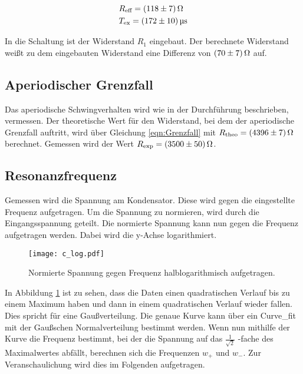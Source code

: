 \begin{align}
    &R_{\text{eff}} = \qty{118 \pm 7}{\ohm} \\
    &T_{\text{ex}} = \qty{172 \pm 10}{\micro \second}
\end{align}    

\noindent In die Schaltung ist der Widerstand $R_1$ eingebaut. Der berechnete Widerstand weißt zu dem eingebauten Widerstand eine Differenz 
von $\qty{70 \pm 7}{\ohm}$ auf. 


\subsection{Aperiodischer Grenzfall}

Das aperiodische Schwingverhalten wird wie in der Durchführung beschrieben, vermessen. Der theoretische Wert für den Widerstand, bei dem der aperiodische
Grenzfall auftritt, wird über Gleichung \eqref{eqn:Grenzfall} mit $R_\text{theo} = \qty{4396 \pm 7}{\ohm}$ berechnet.
Gemessen wird der Wert $R_\text{exp} = \qty{3500 \pm 50}{\ohm}$.

\subsection{Resonanzfrequenz}

Gemessen wird die Spannung am Kondensator. Diese wird gegen die eingestellte Frequenz aufgetragen. Um die Spannung zu normieren, wird durch 
die Eingangsspannung geteilt. Die normierte Spannung kann nun gegen die Frequenz aufgetragen werden. 
Dabei wird die y-Achse logarithmiert. 

\begin{figure}[H]
    \texttt{[image: c\_log.pdf]}
    \caption{Normierte Spannung gegen Frequenz halblogarithmisch aufgetragen.}
    \label{fig:c_log}
\end{figure}

\noindent In Abbildung \ref{fig:c_log} ist zu sehen, dass die Daten einen quadratischen Verlauf bis zu einem Maximum haben und dann in einem 
quadratischen Verlauf wieder fallen. Dies spricht für eine Gaußverteilung.
Die genaue Kurve kann über ein Curve\_fit mit der Gaußschen Normalverteilung bestimmt werden. Wenn nun mithilfe der Kurve die 
Frequenz bestimmt, bei der die Spannung auf das $\frac{1}{\sqrt 2}$ -fache des Maximalwertes abfällt, berechnen sich die Frequenzen $w_+$ und 
$w_-$. Zur Veranschaulichung wird dies im Folgenden aufgetragen.

